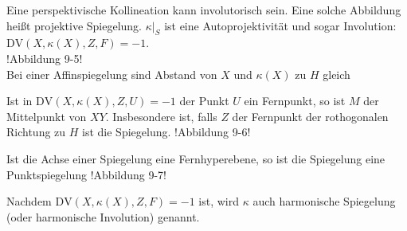 \documentclass[11pt]{article}
\begin{document}
\begin{remark}
Eine perspektivische Kollineation kann involutorisch sein. Eine solche Abbildung heißt projektive Spiegelung. $\kappa|_S$ ist eine Autoprojektivität und sogar Involution: $\mathrm{DV}(X, \kappa(X), Z, F) = -1$. 
\\
!Abbildung 9-5!
\\
Bei einer Affinspiegelung sind Abstand von $X$ und $\kappa(X)$ zu $H$ gleich
\end{remark}
\begin{remark}
Ist in $\mathrm{DV}(X, \kappa(X), Z, U) = -1$ der Punkt $U$ ein Fernpunkt, so ist $M$ der Mittelpunkt von $XY$. Insbesondere ist, falls $Z$ der Fernpunkt der rothogonalen Richtung zu $H$ ist die Spiegelung.
!Abbildung 9-6!
\end{remark}
\begin{remark}
Ist die Achse einer Spiegelung eine Fernhyperebene, so ist die Spiegelung eine Punktspiegelung !Abbildung 9-7!
\end{remark}
\begin{remark}
Nachdem $\mathrm{DV}(X,\kappa(X),Z,F) = -1$ ist, wird $\kappa$ auch harmonische Spiegelung (oder harmonische Involution) genannt.
\end{remark}
\end{document}
